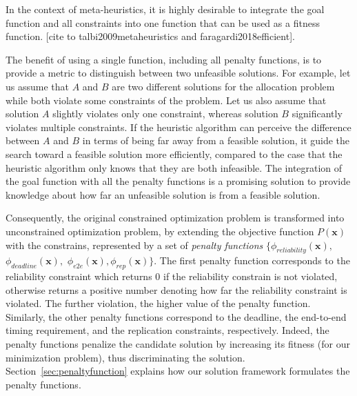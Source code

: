 In the context of meta-heuristics, it is highly desirable to integrate the goal function and all constraints into one function that can be
used as a fitness function. [cite to talbi2009metaheuristics and faragardi2018efficient].



The benefit of using a single function, including all penalty functions, is to provide a metric to distinguish between two unfeasible solutions. For example, let us assume that $A$ and $B$ are two different solutions for the allocation problem while both violate
some constraints of the problem. Let us also assume that solution
$A$ slightly violates only one constraint, whereas solution
$B$ significantly violates multiple constraints. If the heuristic algorithm can perceive the difference between $A$ and $B$
in terms of being far away from a feasible solution, it guide the search toward a feasible solution more efficiently, compared to the case that the heuristic algorithm only knows that they are both infeasible. The integration of the goal function with all
the penalty functions is a promising solution to provide knowledge about how far an unfeasible solution is from a feasible
solution. 

Consequently, the original constrained optimization problem is transformed into unconstrained optimization problem, by extending the objective function $P(\textbf{x})$ with the constrains, represented by a set of \textit{penalty functions} $\{\phi_{reliability}(\textbf{x}),$  $\phi_{deadline}(\textbf{x}),$ $\phi_{e2e}(\textbf{x}), \phi_{rep}(\textbf{x})\}$. The first penalty function corresponds to the reliability constraint which returns 0 if the reliability constrain is not violated, otherwise returns a positive number denoting how far the reliability constraint is violated. The further violation, the higher value of the penalty function.
Similarly, the other penalty functions correspond to the deadline, the end-to-end timing requirement, and the replication constraints, respectively. 
Indeed, the penalty functions penalize the candidate solution by increasing its fitness (for our minimization problem), thus discriminating the solution. Section~\ref{sec:penaltyfunction} explains how our solution framework formulates the penalty functions.

